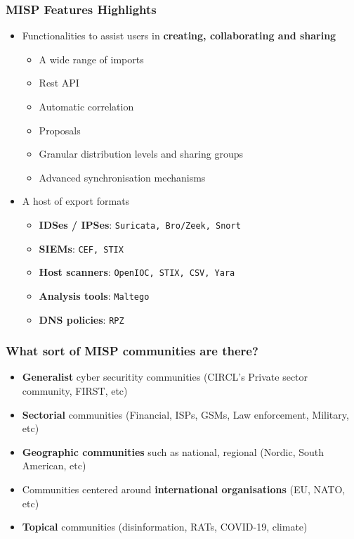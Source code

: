 \begin{frame}
\frametitle{MISP Features Highlights}
    \begin{itemize}
        \item Functionalities to assist users in {\bf creating, collaborating and sharing}
        \begin{itemize}
            \item A wide range of imports
            \item Rest API
            \item Automatic correlation
            \item Proposals
            \item Granular distribution levels and sharing groups
            \item Advanced synchronisation mechanisms
        \end{itemize}
        \item A host of export formats
        \begin{itemize}
            \item {\bf IDSes / IPSes}: \texttt{Suricata, Bro/Zeek, Snort}
            \item {\bf SIEMs}: \texttt{CEF, STIX} 
            \item {\bf Host scanners}:  \texttt{OpenIOC, STIX, CSV, Yara}
            \item {\bf Analysis tools}: \texttt{Maltego}
            \item {\bf DNS policies}: \texttt{RPZ}
        \end{itemize}
    \end{itemize}
\end{frame}

\begin{frame}
\frametitle{What sort of MISP communities are there?}
\begin{itemize}
       \item {\bf Generalist} cyber securitity communities (CIRCL's Private sector community, FIRST, etc)
       \item {\bf Sectorial} communities (Financial, ISPs, GSMs, Law enforcement, Military, etc)
       \item {\bf Geographic communities} such as national, regional (Nordic, South American, etc)
       \item Communities centered around {\bf international organisations} (EU, NATO, etc)
       \item {\bf Topical} communities (disinformation, RATs, COVID-19, climate)
\end{itemize}
\end{frame}


